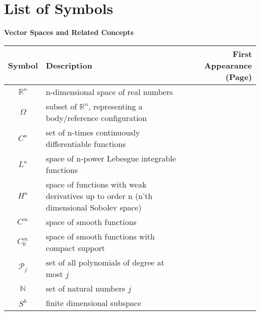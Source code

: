 \documentclass[main.tex]{subfiles}
\begin{document}
\chapter*{List of Symbols}

\noindent
\textbf{Vector Spaces and Related Concepts}\\
\begin{tabularx}{\textwidth}{cXr}
\toprule
Symbol & Description & First Appearance (Page) \\ 
\midrule
\( \mathbb{R}^n \) & n-dimensional space of real numbers & \pageref{sym:Rn} \\
\( \Omega \) & subset of \( \mathbb{R}^n \), representing a body/reference configuration & \pageref{sym:Omega} \\
\( C^n \) & set of n-times continuously differentiable functions & \pageref{sym:Cn} \\
\( L^n \) & space of n-power Lebesgue integrable functions & \pageref{sym:Ln} \\
\( H^n \) & space of functions with weak derivatives up to order n (n'th dimensional Sobolev space) & \pageref{sym:Hn} \\
\( C^\infty \) & space of smooth functions & \pageref{sym:Cinfty} \\
\( C^\infty_0 \) & space of smooth functions with compact support & \pageref{sym:Cinftyzero} \\
\( \mathcal{P}_j \) & set of all polynomials of degree at most \( j \) & \pageref{sym:poly} \\
\( \mathbb{N} \) & set of natural numbers \( j \) & \pageref{sym:natural} \\
\( S^h \) & finite dimensional subspace & \pageref{sym:Sh1} \\

\bottomrule
\end{tabularx}
\end{document}
